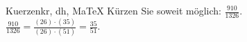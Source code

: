 \begin{MAufgabe}{Kuerzen}{kr, dh, MaTeX}
K\"urzen Sie soweit m\"oglich: $\frac{910}{1326}$.\\ 
\ifLsg\MLoesung
\quad $\frac{910}{1326}=\frac{(26)\cdot(35)}{(26)\cdot(51)}=\frac{35}{51}$.\else\relax\fi
 \end{MAufgabe}